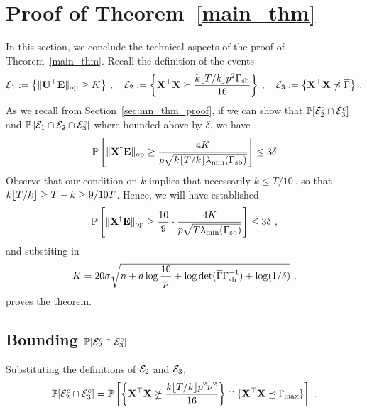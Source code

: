 \section{Proof of Theorem~\ref{main_thm} \label{app:main_thm}}
In this section, we conclude the technical aspects of the proof of Theorem~\ref{main_thm}. Recall the definition of the events
\begin{align*}
  \mathcal{E}_1 := \left\{ \lVert \mathbf{U}^{\top} \mathbf{E} \rVert_{\mathrm{op}} \geq K \right\} \:, \quad \mathcal{E}_2 := \left\{\mathbf{X}^\top\mathbf{X} \succeq \frac{k\lfloor T/k\rfloor p^2 \Gamma_{\mathrm{sb}} }{16}\right\} \:, \quad \mathcal{E}_3 := \left\{ \mathbf{X}^\top\mathbf{X} \npreceq \overline{\Gamma} \right\} \:.
\end{align*}
As we recall from Section~\ref{sec:mn_thm_proof}, if we can show that $\mathbb{P}[ \mathcal{E}_2^c \cap \mathcal{E}_3^c]$ and $\mathbb{P}\left[ \mathcal{E}_1 \cap \mathcal{E}_2 \cap \mathcal{E}_3^c \right]$ where bounded above by $\delta$, we have
\begin{eqnarray}
 \mathbb{P} \left[\lVert \mathbf{X}^{\dagger} \mathbf{E} \rVert_{\mathrm{op}} \geq \frac{4K}{p\sqrt{k\lfloor T/k\rfloor\lambda_{\min}(\Gamma_{\mathrm{sb}}) }} \right] \le 3\delta
\end{eqnarray}
Observe that our condition on $k$ implies that necessarily $k \le T/10~$, so that $k\lfloor T/k\rfloor \ge T - k \ge 9/10T$. Hence, we will have established
\begin{eqnarray}
 \mathbb{P} \left[\lVert \mathbf{X}^{\dagger} \mathbf{E} \rVert_{\mathrm{op}} \geq \frac{10}{9} \cdot \frac{4K}{p\sqrt{T\lambda_{\min}(\Gamma_{\mathrm{sb}}) }}  \right] \le 3\delta~,
\end{eqnarray}
and substiting in 
\begin{eqnarray}
K =  20\sigma \sqrt{n + d\log \frac{10}{p} + \log \det(\overline{\Gamma}\Gamma_{\mathrm{sb}}^{-1}) + \log(1/\delta) }~.
\end{eqnarray}
proves the theorem. 

\subsection{Bounding $\mathbb{P}[ \mathcal{E}_2^c \cap \mathcal{E}_3^c]$ \label{app:main_sigm_min}}

Substituting the definitions of $\mathcal{E}_2$ and $\mathcal{E}_3$,
\begin{eqnarray*}
\mathbb{P}[ \mathcal{E}_2^c \cap \mathcal{E}_3^c]= \mathbb{P}\left[\left\{ \mathbf{X}^\top\mathbf{X} \nsucceq \frac{k\lfloor T/k\rfloor p^2 \nu^2 }{16}\right\} \cap \{\mathbf{X}^\top\mathbf{X} \preceq \mathtt{\Gamma}_{\max}\}\right]~.
\end{eqnarray*}
%

